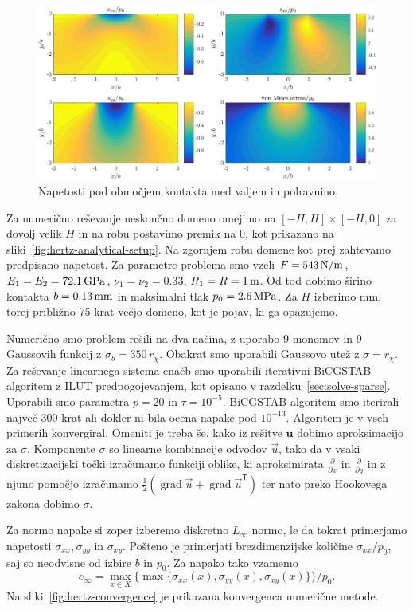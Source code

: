 \documentclass[12pt,a4paper,twoside]{article}
\theoremstyle{definition} %
\theoremstyle{plain} %
\numberwithin{equation}{section}
\newcommand{\T}{\mathsf{T}}
\newcommand{\grad}{\operatorname{grad}}
\renewcommand{\b}{\boldsymbol}
\newcommand{\dpar}[2]{\ensuremath{\frac{\partial #1}{\partial #2}}}
\newcommand{\vu}{\vec{u}}
\begin{document}
\begin{figure}[h]
  \centering
  \includegraphics[width=\textwidth]{images/hertzian_analytical.png}
  \caption{Napetosti pod območjem kontakta med valjem in polravnino.}
  \label{fig:hertz-analytical}
\end{figure}

Za numerično reševanje neskončno domeno omejimo na $[-H, H] \times [-H, 0]$ za dovolj velik $H$
in na robu postavimo premik na 0, kot prikazano na sliki~\ref{fig:hertz-analytical-setup}. Na
zgornjem robu domene kot prej zahtevamo predpisano napetost.  Za parametre problema smo vzeli $F =
\unit[543]{N/m}$, $E_1 = E_2 = \unit[72.1]{GPa}$, $\nu_1 = \nu_2 = 0.33$, $R_1 = R = \unit[1]{m}$.
Od tod dobimo širino kontakta $b = \unit[0.13]{mm}$ in maksimalni tlak $p_0 = \unit[2.6]{MPa}$.
Za $H$ izberimo \unit[10]{mm}, torej približno 75-krat večjo domeno, kot je pojav, ki ga opazujemo.

Numerično smo problem rešili na dva načina, z uporabo 9 monomov in 9 Gaussovih funkcij z $\sigma_b =
350\,r_\chi$. Obakrat smo uporabili Gaussovo utež z $\sigma = r_\chi$. Za reševanje linearnega
sistema enačb smo uporabili iterativni BiCGSTAB algoritem z ILUT predpogojevanjem, kot opisano v
razdelku~\ref{sec:solve-sparse}. Uporabili smo parametra $p=20$ in $\tau = 10^{-5}$. BiCGSTAB
algoritem smo iterirali največ 300-krat ali dokler ni bila ocena napake pod $10^{-13}$. Algoritem je
v vseh primerih konvergiral. Omeniti je treba še, kako iz rešitve $\b{u}$ dobimo aproksimacijo za
$\sigma$. Komponente $\sigma$ so linearne kombinacije odvodov $\vu$, tako da v vsaki
diskretizacijski točki izračunamo funkciji oblike, ki aproksimirata $\dpar{}{x}$ in $\dpar{}{y}$
in z njuno pomočjo izračunamo $\frac12 (\grad\vu + \grad\vu^\T)$ ter nato preko Hookovega zakona
dobimo $\sigma$.

Za normo napake si zoper izberemo diskretno $L_\infty$ normo, le da tokrat
primerjamo napetosti $\sigma_{xx}, \sigma_{yy}$ in $\sigma_{xy}$. Pošteno je primerjati
brezdimenzijske količine $\sigma_{xx}/p_0$, saj so neodvisne od izbire $b$ in $p_0$.
Za napako tako vzamemo
\[
  e_\infty = \max_{x\in X} \{\max\{\sigma_{xx}(x), \sigma_{yy}(x), \sigma_{xy}(x) \}\} / p_0.
\]
Na sliki~\ref{fig:hertz-convergence} je prikazana konvergenca numerične metode.
\end{document}
